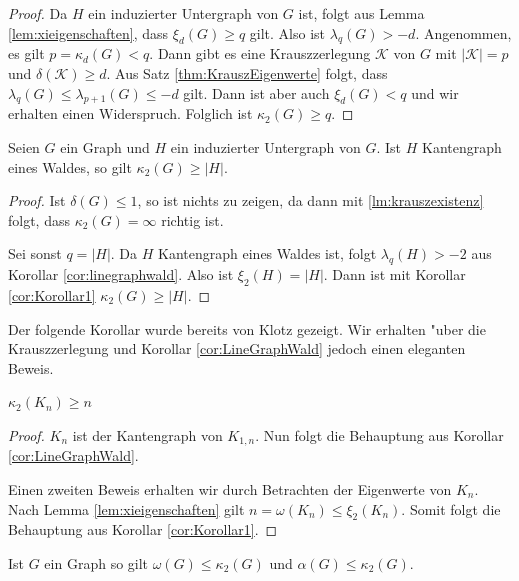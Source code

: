 \begin{proof}
  Da $H$ ein induzierter Untergraph von $G$ ist, folgt aus Lemma \ref{lem:xieigenschaften}, dass $\xi_{d}(G) \geq q$ gilt. Also ist $\lambda_{q}(G) > -d$. 
  Angenommen, es gilt $p = \kappa_{d}(G) < q$. Dann gibt es  eine Krauszzerlegung $\mathcal{K}$ von $G$ mit $|\mathcal{K}| = p$ und $\delta(\mathcal{K}) \geq d$. Aus Satz \ref{thm:KrauszEigenwerte} folgt, dass $\lambda_{q}(G) \leq \lambda_{p+1}(G) \leq -d $ gilt. Dann ist aber auch $\xi_{d}(G) < q$ und wir erhalten einen Widerspruch. Folglich ist $\kappa_2(G) \geq q$.
\end{proof}

\begin{corollary}
  \label{cor:LineGraphWald}
  Seien $G$ ein Graph und $H$ ein induzierter Untergraph von $G$. Ist $H$ Kantengraph eines Waldes, so gilt 
  $\kappa_{2}(G)\geq \left|H\right|$.
\end{corollary}

\begin{proof}
  Ist $\delta(G) \leq 1$, so ist nichts zu zeigen, da dann mit \ref{lm:krauszexistenz} folgt, dass $\kappa_2(G) = \infty$ richtig ist.

  Sei sonst $q = |H|$. Da $H$ Kantengraph eines Waldes ist, folgt $\lambda_{q}(H) > -2$ aus Korollar \ref{cor:linegraphwald}. Also ist $\xi_{2}(H) = |H|$.
  Dann ist mit Korollar \ref{cor:Korollar1} $\kappa_{2}\left( G \right) \geq \left| H\right|$.
\end{proof}
Der folgende Korollar wurde bereits von Klotz \cite{Klotz89} gezeigt. Wir erhalten "uber die Krauszzerlegung und Korollar \ref{cor:LineGraphWald} jedoch einen eleganten Beweis.
\begin{corollary}[Klotz]
  $\kappa_{2}\left( K_n \right) \geq n$
\end{corollary}

\begin{proof}
  $K_n$ ist der Kantengraph von $K_{1,n}$. Nun folgt die Behauptung aus Korollar \ref{cor:LineGraphWald}.

  Einen zweiten Beweis erhalten wir durch Betrachten der Eigenwerte von $K_n$. Nach Lemma \ref{lem:xieigenschaften} gilt $n = \omega(K_n) \leq \xi_{2}(K_n)$. Somit folgt die Behauptung aus Korollar \ref{cor:Korollar1}.
\end{proof}

\begin{corollary}
  Ist $G$ ein Graph so gilt $\omega\left( G \right)\leq \kappa_{2}\left( G \right)$ und $\alpha\left( G \right)\leq \kappa_{2}\left( G \right)$.
  \label{cor:alphaomegakrausz}
\end{corollary}

